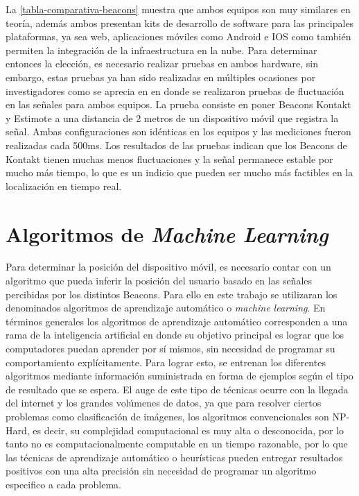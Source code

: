 La \autoref{tabla-comparativa-beacons} muestra que ambos equipos son muy similares en teoría, además ambos presentan kits de desarrollo de software para las principales plataformas, ya sea web, aplicaciones móviles como Android e IOS como también permiten la integración de la infraestructura en la nube. Para determinar entonces la elección, es necesario realizar pruebas en ambos hardware, sin embargo, estas pruebas ya han sido realizadas en múltiples ocasiones por investigadores como se aprecia en \citep{comparativaKontakt} en donde se realizaron pruebas de fluctuación en las señales para ambos equipos. La prueba consiste en poner Beacons Kontakt y Estimote a una distancia de 2 metros de un dispositivo móvil que registra la señal. Ambas configuraciones son idénticas en los equipos y las mediciones fueron realizadas cada 500ms. Los resultados de las pruebas indican que los Beacons de Kontakt tienen muchas menos fluctuaciones y la señal permanece estable por mucho más tiempo, lo que es un indicio que pueden ser mucho más factibles en la localización en tiempo real.

\section{Algoritmos de \textit{Machine Learning}}

Para determinar la posición del dispositivo móvil, es necesario contar con un algoritmo que pueda inferir la posición del usuario basado en las señales percibidas por los distintos Beacons. Para ello en este trabajo se utilizaran los denominados algoritmos de aprendizaje automático o \textit{machine learning}. En términos generales los algoritmos de aprendizaje automático corresponden a una rama de la inteligencia artificial en donde su objetivo principal es lograr que los computadores puedan aprender por sí mismos, sin necesidad de programar su comportamiento explícitamente. Para lograr esto, se entrenan los diferentes algoritmos mediante información suministrada en forma de ejemplos según el tipo de resultado que se espera. El auge de este tipo de técnicas ocurre con la llegada del internet y los grandes volúmenes de datos, ya que para resolver ciertos problemas como clasificación de imágenes, los algoritmos convencionales son NP-Hard, es decir, su complejidad computacional es muy alta o desconocida, por lo tanto no es computacionalmente computable en un tiempo razonable, por lo que las técnicas de aprendizaje automático o heurísticas pueden entregar resultados positivos con una alta precisión sin necesidad de programar un algoritmo especifico a cada problema.

